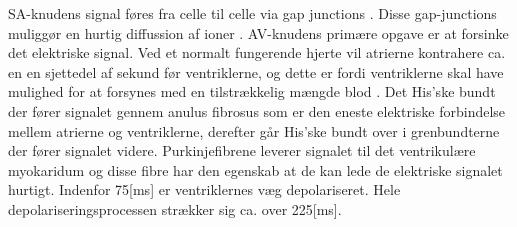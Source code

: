 \noindent SA-knudens signal føres fra celle til celle via gap junctions \cite{gronanatomi}. Disse gap-junctions muliggør en hurtig diffussion af ioner \cite{guyton}. AV-knudens primære opgave er at  forsinke det elektriske signal. Ved et normalt fungerende hjerte vil atrierne kontrahere ca. en en sjettedel af sekund før ventriklerne, og dette er fordi ventriklerne skal have mulighed for at forsynes med en tilstrækkelig mængde blod \cite{guyton}. Det His'ske bundt der fører signalet gennem anulus fibrosus som er den eneste elektriske forbindelse mellem atrierne og ventriklerne, derefter går His'ske bundt over i grenbundterne der fører signalet videre. Purkinjefibrene leverer signalet til det ventrikulære myokaridum og disse fibre har den egenskab at de kan lede de elektriske signalet hurtigt. Indenfor 75[ms] er ventriklernes væg depolariseret. Hele depolariseringsprocessen strækker sig ca. over 225[ms]\cite{gronanatomi}.



